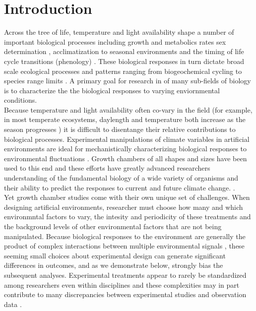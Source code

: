 \documentclass{article}[11pt]
\begin{document}
\section*{Introduction}
\noindent Across the tree of life, temperature and light availability shape a number of important biological processes including growth and metabolics rates \citep{} sex determination \citep{}, acclimatization to seasonal environments \citep{} and the timing of life cycle transitions (phenology) \citep{}. These biological responses in turn dictate broad scale ecological processes and patterns ranging from biogeochemical cycling \citep{} to species range limits \citep{}.
A primary goal for research in of many sub-fields of biology is to characterize the the biological responses to varying enviornmental conditions.\\


\noindent Because temperature and light availability often co-vary in the field (for example, in most temperate ecosystems, daylength and temperature both increase as the season progresses \citep{}) it is difficult to disentange their relative contributions to biological processes. Experimental manipulations of climate variables in artificial environments are ideal for mechanistically characterizing biological responses to environmental fluctuations \citep{Ettinger_inprep,Primack2015}. Growth chambers of all shapes and sizes have been used to this end \citep{} and these efforts have greatly advanced researchers understanding of the fundamental biology of a wide variety of organisms and their ability to predict the responses to current and future climate change. \citep{}.\\ 

\noindent Yet growth chamber studies come with their own unique set of challenges. When designing artificial environments, researcher must choose how many and which environmntal factors to vary, the intesity and periodicity of these treatments and the background levels of other environmental factors that are not being manipulated. Because biological responses to the environment are generally the product of complex interactions between multiple environmental signals \citep{}, these seeming small choices about experimental design can generate significant differences in outcomes, and as we demonstrate below, strongly bias the subsequent analyses. Experimental treatments appear to rarely be standardized among researchers even within disciplines \citep{} and these complexities may in part contribute to many discrepancies between experimental studies and observation data \citep{Poorter:2016aa}.\\
\end{document}
